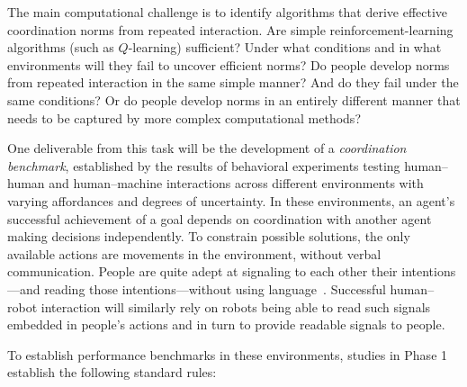 \documentclass[12pt]{article}
\begin{document}
The main computational challenge is to identify algorithms that derive
effective coordination norms from repeated interaction. Are simple
reinforcement-learning algorithms (such as $Q$-learning) sufficient?
Under what conditions and in what environments will they fail to
uncover efficient norms?  Do people develop norms from repeated
interaction in the same simple manner? And do they fail under the same
conditions?  Or do people develop norms in an entirely different
manner that needs to be captured by more complex computational
methods?

One deliverable from this task will be the development of a {\em
  coordination benchmark}, established by the results of behavioral
experiments testing human--human and human--machine interactions
across different environments with varying affordances and degrees of
uncertainty.  In these environments, an agent's successful achievement
of a goal depends on coordination with another agent making decisions
independently.  To constrain possible solutions, the only available
actions are movements in the environment, without verbal
communication.  People are quite adept at signaling to each other
their intentions---and reading those intentions---without using
language~\citep{pentland08}. Successful human--robot interaction will
similarly rely on robots being able to read such signals embedded in
people's actions and in turn to provide readable signals to people.

To establish performance benchmarks in these environments, studies in
Phase 1 establish the following standard rules:
\end{document}
